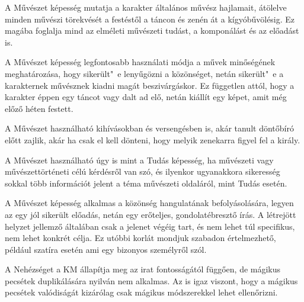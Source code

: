 
A Művészet képesség mutatja a karakter általános művész hajlamait, átölelve minden művészi törekvését a festéstől a táncon és zenén át a kígyóbűvölésig. Ez magába foglalja mind az elméleti művészeti tudást, a komponálást és az előadást is.

\overcome A Művészet képesség legfontosabb használati módja a művek minőségének meghatározása, hogy sikerült"~e lenyűgözni a közönséget, netán sikerült"~e a karakternek művésznek kiadni magát beszivárgáskor. Ez független attól, hogy a karakter éppen egy táncot vagy dalt ad elő, netán kiállít egy képet, amit még előző héten festett.

A Művészet használható kihívásokban és versengésben is, akár tanult döntőbíró előtt zajlik, akár ha csak el kell dönteni, hogy melyik zenekarra figyel fel a király.

A Művészet használható úgy is mint a Tudás képesség, ha művészeti vagy művészettörténeti célú kérdésről van szó, és ilyenkor ugyanakkora sikeresség sokkal több információt jelent a téma művészeti oldaláról, mint Tudás esetén.

\advantage A Művészet képesség alkalmas a közönség hangulatának befolyásolására, legyen az egy jól sikerült előadás, netán egy erőteljes, gondolatébresztő írás. A létrejött helyzet jellemző általában csak a jelenet végéig tart, és nem lehet túl specifikus, nem lehet konkrét célja. Ez utóbbi korlát mondjuk szabadon értelmezhető, például szatíra esetén ami egy bizonyos személyről szól.

\noattackatall

\nodefendatall





A Nehézséget a KM állapítja meg az irat fontosságától függően, de mágikus pecsétek duplikálására nyilván nem alkalmas. Az is igaz viszont, hogy a mágikus pecsétek valódiságát kizárólag csak mágikus módszerekkel lehet ellenőrizni.
